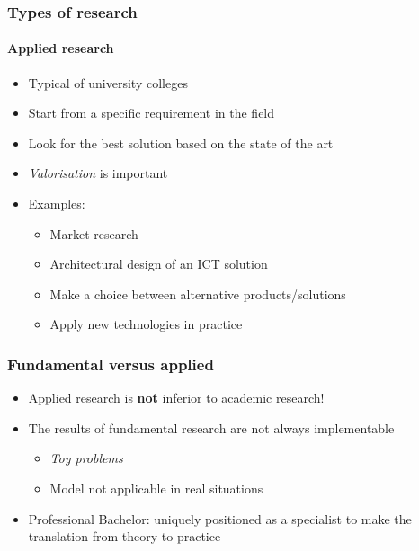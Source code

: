 \documentclass[aspectratio=169]{beamer}
\begin{document}
    \begin{frame}
        \frametitle{Types of research}
        \framesubtitle{Applied research}
        
        \begin{itemize}
            \item Typical of university colleges
            \item Start from a specific requirement in the field
            \item Look for the best solution based on the state of the art 
            \item \textit{Valorisation} is important
            \item Examples:
            \begin{itemize}
                \item Market research
                \item Architectural design of an ICT solution
                \item Make a choice between alternative products/solutions
                \item Apply new technologies in practice
            \end{itemize}
        \end{itemize}
        
    \end{frame}
    
    \begin{frame}
        \frametitle{Fundamental versus applied}
        
        \begin{itemize}
            \item Applied research is \textbf{not} inferior to academic research!
            \item The results of fundamental research are not always implementable
            \begin{itemize}
                \item \textit{Toy problems}
                \item Model not applicable in real situations
            \end{itemize}
            \item Professional Bachelor: uniquely positioned as a specialist to make the translation from theory to practice
        \end{itemize}
        
    \end{frame}
    
\end{document}
